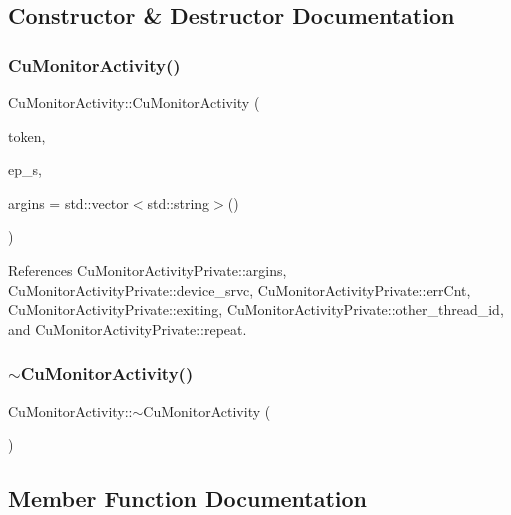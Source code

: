 \subsection{Constructor \& Destructor Documentation}
\mbox{\label{classCuMonitorActivity_af6604312a7d09913db86fec86d1e4a44}} 
\subsubsection{Cu\+Monitor\+Activity()}
{\footnotesize\ttfamily Cu\+Monitor\+Activity\+::\+Cu\+Monitor\+Activity (\begin{DoxyParamCaption}\item[{const Cu\+Data \&}]{token,  }\item[{\textbf{ Cu\+Ep\+C\+A\+Service} $\ast$}]{ep\+\_\+s,  }\item[{const Cu\+Variant \&}]{argins = {\ttfamily std\+:\+:vector$<$std\+:\+:string$>$()} }\end{DoxyParamCaption})}



References Cu\+Monitor\+Activity\+Private\+::argins, Cu\+Monitor\+Activity\+Private\+::device\+\_\+srvc, Cu\+Monitor\+Activity\+Private\+::err\+Cnt, Cu\+Monitor\+Activity\+Private\+::exiting, Cu\+Monitor\+Activity\+Private\+::other\+\_\+thread\+\_\+id, and Cu\+Monitor\+Activity\+Private\+::repeat.

\mbox{\label{classCuMonitorActivity_a09d298bf6e31647caa68ed854f42e72b}} 
\subsubsection{$\sim$\+Cu\+Monitor\+Activity()}
{\footnotesize\ttfamily Cu\+Monitor\+Activity\+::$\sim$\+Cu\+Monitor\+Activity (\begin{DoxyParamCaption}{ }\end{DoxyParamCaption})}



\subsection{Member Function Documentation}
\mbox{\label{classCuMonitorActivity_a71f2bc9f31906dc44b53a31c7a625661}} 
